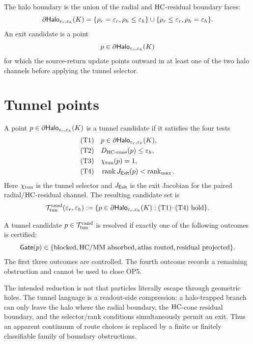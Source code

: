 \begin{definition}
The halo boundary is the union of the radial and \(\mathrm{HC}\)-residual boundary faces:
\[
\partial\mathsf{Halo}_{\varepsilon_r,\varepsilon_h}(K)
=
\{\rho_r=\varepsilon_r,\rho_h\le\varepsilon_h\}
\cup
\{\rho_r\le\varepsilon_r,\rho_h=\varepsilon_h\}.
\]
An exit candidate is a point
\[
p\in\partial\mathsf{Halo}_{\varepsilon_r,\varepsilon_h}(K)
\]
for which the source-return update points outward in at least one of the two halo channels before applying the tunnel selector.
\end{definition}

\section{Tunnel points}

\begin{definition}
A point \(p\in\partial\mathsf{Halo}_{\varepsilon_r,\varepsilon_h}(K)\) is a tunnel candidate if it satisfies the four tests
\[
\begin{aligned}
&\text{(T1)}\quad p\in\partial\mathsf{Halo}_{\varepsilon_r,\varepsilon_h}(K),\\
&\text{(T2)}\quad D_{\mathrm{HC}\text{-}\mathrm{cone}}(p)\le\varepsilon_h,\\
&\text{(T3)}\quad \chi_{\mathrm{tun}}(p)=1,\\
&\text{(T4)}\quad \operatorname{rank}J_{\mathsf{Exit}}(p)<\operatorname{rank}_{\max}.
\end{aligned}
\]
Here \(\chi_{\mathrm{tun}}\) is the tunnel selector and \(J_{\mathsf{Exit}}\) is the exit Jacobian for the paired radial/\(\mathrm{HC}\)-residual channel. The resulting candidate set is
\[
\mathcal T_{\mathrm{tun}}^{\mathrm{cand}}(\varepsilon_r,\varepsilon_h)
:=
\{p\in\partial\mathsf{Halo}_{\varepsilon_r,\varepsilon_h}(K):\text{(T1)--(T4) hold}\}.
\]
\end{definition}

\begin{definition}
A tunnel candidate \(p\in\mathcal T_{\mathrm{tun}}^{\mathrm{cand}}\) is resolved if exactly one of the following outcomes is certified:
\[
\Gate(p)
\in
\{\mathrm{blocked},\mathrm{HC/MM\ absorbed},\mathrm{atlas\ routed},\mathrm{residual\ projected}\}.
\]
The first three outcomes are controlled. The fourth outcome records a remaining obstruction and cannot be used to close OP5.
\end{definition}

\begin{remark}
The intended reduction is not that particles literally escape through geometric holes. The tunnel language is a readout-side compression: a halo-trapped branch can only leave the halo where the radial boundary, the \(\mathrm{HC}\)-cone residual boundary, and the selector/rank conditions simultaneously permit an exit. Thus an apparent continuum of route choices is replaced by a finite or finitely classifiable family of boundary obstructions.
\end{remark}

